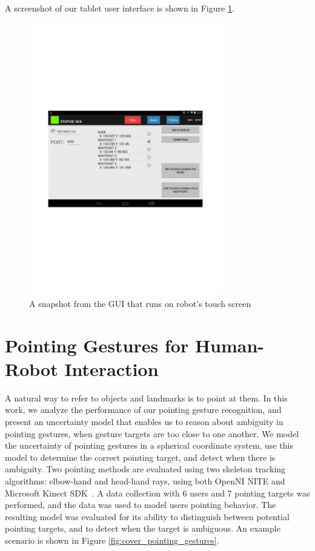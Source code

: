 A screenshot of our tablet user interface is shown in Figure \ref{fig:ui}.

\begin{figure}[ht!]
\centering
\includegraphics[width=0.75\textwidth]{pics/ui}
\caption{A snapshot from the GUI that runs on robot's touch screen}
\label{fig:ui}
\end{figure}

\section{Pointing Gestures for Human-Robot Interaction}
\label{sec:pointing_gestures}

A natural way to refer to objects and landmarks is to point at them. In this work, we analyze the performance of our pointing gesture recognition, and present an uncertainty model that enables us to reason about ambiguity in pointing gestures, when gesture targets are too close to one another. We model the uncertainty of pointing gestures in a spherical coordinate system, use this model to determine the correct pointing target, and detect when there is ambiguity. Two pointing methods are evaluated using two skeleton tracking algorithms: elbow-hand and head-hand rays, using both OpenNI NITE and Microsoft Kinect SDK~\cite{shotton2011real}.  A data collection with 6 users and 7 pointing targets was performed, and the data was used to model users pointing behavior.  The resulting model was evaluated for its ability to distinguish between potential pointing targets, and to detect when the target is ambiguous.  An example scenario is shown in Figure \ref{fig:cover_pointing_gestures}.

